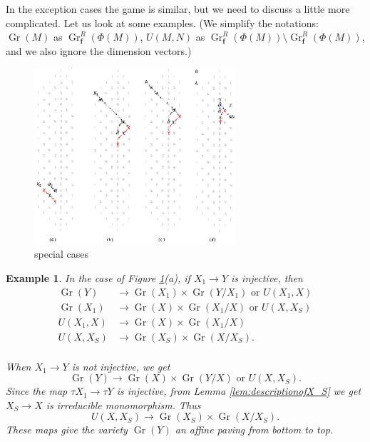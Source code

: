 \documentclass[reqno,11pt]{amsart}
\numberwithin{equation}{section}
\theoremstyle{plain}
\newtheorem{eg}[theorem]{Example}
\theoremstyle{plain}
\numberwithin{equation}{section}
\theoremstyle{remark}
\newcommand{\Gr}{\operatorname{Gr}}
\newcommand{\Grr}{\operatorname{Gr}^{R}}
\newcommand{\dimvec}[1]{\mathbf{#1}}
\begin{document}
In the exception cases the game is similar, but we need to discuss a little more complicated. Let us look at some examples. (We simplify the notations: $\Gr(M)$ as $\Grr_{\dimvec{f}}(\Phi(M))$, $U(M,N)$ as $\Grr_{\dimvec{f}}(\Phi(M)) \setminus \Grr_{\dimvec{f}}(\Phi(M))$, and we also ignore the dimension vectors.)
	\begin{center}
		\begin{figure}[ht]
			\vspace{0cm}
			\centering
			\includegraphics[width=7.5cm]{figures/specialcases.png}
			\caption{special cases}
			\label{fig:specialcases}
			\vspace{0.2cm}
		\end{figure}
	\end{center}
\begin{eg}
In the case of Figure \ref{fig:specialcases}(a), if $X_1 \longrightarrow Y$ is injective, then
\begin{equation*}
\begin{aligned}
\Gr(Y) &\longrightarrow \Gr(X_1) \times \Gr(Y/X_1) \text{ or } U(X_1,X)\\
\Gr(X_1) &\longrightarrow \Gr(X) \times \Gr(X_1/X) \text{ or } U(X,X_S)\\
U(X_1,X) &\longrightarrow \Gr(X) \times \Gr(X_1/X) \\
U(X,X_S) &\longrightarrow \Gr(X_S) \times \Gr(X/X_S). \\
\end{aligned}
\end{equation*}

When $X_1 \longrightarrow Y$ is not injective, we get
$$\Gr(Y) \longrightarrow \Gr(X) \times \Gr(Y/X) \text{ or } U(X,X_S).$$
Since the map $\tau X_1 \longrightarrow \tau Y$ is injective, from Lemma \ref{lem:descriptionofX_S} we get $X_S\longrightarrow X$ is irreducible monomorphism. Thus
$$U(X,X_S) \longrightarrow \Gr(X_S) \times \Gr(X/X_S).$$
These maps give the variety $\Gr(Y)$ an affine paving from bottom to top.
\end{eg}
\end{document}

